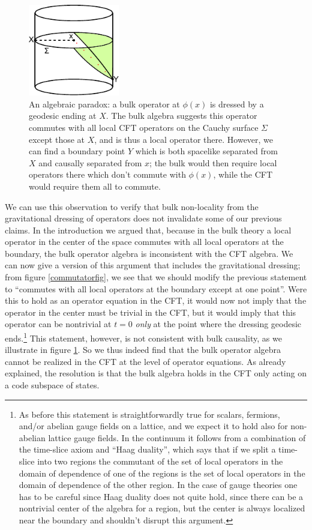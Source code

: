 \documentclass[12pt]{article}
\begin{document}
\begin{figure}
\begin{center}
\includegraphics[height=4cm]{causality.pdf}
\caption{An algebraic paradox: a bulk operator at $\phi(x)$ is dressed by a geodesic ending at $X$.  The bulk algebra suggests this operator commutes with all local CFT operators on the Cauchy surface $\Sigma$ except those at $X$, and is thus a local operator there. However, we can find a boundary point $Y$ which is both spacelike separated from $X$ and causally separated from $x$; the bulk would then require local operators there which don't commute with $\phi(x)$, while the CFT would require them all to commute.}\label{causality}
\end{center}
\end{figure}
We can use this observation to verify that bulk non-locality from the gravitational dressing of operators does not invalidate some of our previous claims.  In the introduction we argued that, because in the bulk theory a local operator in the center of the space commutes with all local operators at the boundary, the bulk operator algebra is inconsistent with the CFT algebra.  We can now give a version of this argument that includes the gravitational dressing; from figure \ref{commutatorfig}, we see that we should modify the previous statement to ``commutes with all local operators at the boundary except at one point''.  Were this to hold as an operator equation in the CFT, it would now not imply that the operator in the center must be trivial in the CFT, but it would imply that this operator can be nontrivial at $t=0$ \textit{only} at the point where the dressing geodesic ends.\footnote{As before this statement is straightforwardly true for scalars, fermions, and/or abelian gauge fields on a lattice, and we expect it to hold also for non-abelian lattice gauge fields.  In the continuum it follows from a combination of the time-slice axiom and ``Haag duality'', which says that if we split a time-slice into two regions the commutant of the set of local operators in the domain of dependence of one of the regions is the set of local operators in the domain of dependence of the other region.  In the case of gauge theories one has to be careful since Haag duality does not quite hold, since there can be a nontrivial center of the algebra for a region, but the center is always localized near the boundary \cite{Casini:2013rba} and shouldn't disrupt this argument.}  This statement, however, is not consistent with bulk causality, as we illustrate in figure \ref{causality}.  So we thus indeed find that the bulk operator algebra cannot be realized in the CFT at the level of operator equations.  As already explained, the resolution is that the bulk algebra holds in the CFT only acting on a code subspace of states.  
\end{document}
